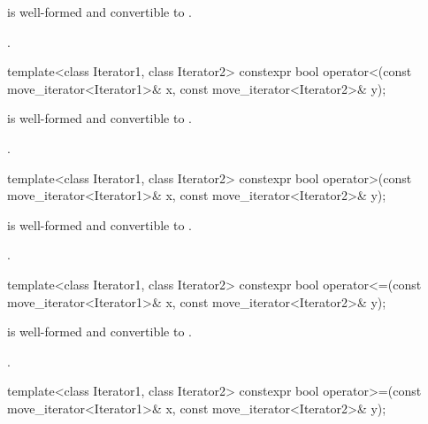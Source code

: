 \begin{itemdescr}
\pnum
\constraints
{} is well-formed and
convertible to .

\pnum
\returns
{}.
\end{itemdescr}

%
\begin{itemdecl}
template<class Iterator1, class Iterator2>
  constexpr bool operator<(const move_iterator<Iterator1>& x, const move_iterator<Iterator2>& y);
\end{itemdecl}

\begin{itemdescr}
\pnum
\constraints
{} is well-formed and
convertible to .

\pnum
\returns
{}.
\end{itemdescr}

%
\begin{itemdecl}
template<class Iterator1, class Iterator2>
  constexpr bool operator>(const move_iterator<Iterator1>& x, const move_iterator<Iterator2>& y);
\end{itemdecl}

\begin{itemdescr}
\pnum
\constraints
{} is well-formed and
convertible to .

\pnum
\returns
{}.
\end{itemdescr}

%
\begin{itemdecl}
template<class Iterator1, class Iterator2>
  constexpr bool operator<=(const move_iterator<Iterator1>& x, const move_iterator<Iterator2>& y);
\end{itemdecl}

\begin{itemdescr}
\pnum
\constraints
{} is well-formed and
convertible to .

\pnum
\returns
{}.
\end{itemdescr}

%
\begin{itemdecl}
template<class Iterator1, class Iterator2>
  constexpr bool operator>=(const move_iterator<Iterator1>& x, const move_iterator<Iterator2>& y);
\end{itemdecl}

